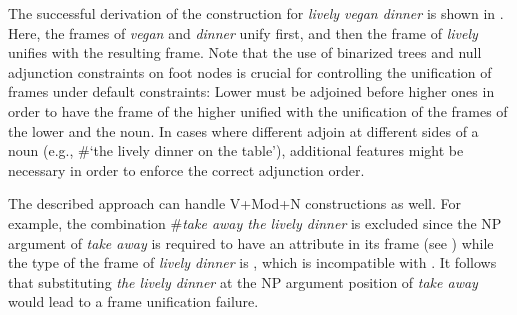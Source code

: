 \documentclass[output=paper,colorlinks,citecolor=brown,chinesefont]{langscibook}
\begin{document}
The successful derivation of the construction for \emph{lively vegan dinner} is shown in . Here, %
the frames of \emph{vegan} and \emph{dinner}  unify first, and then the frame of \emph{lively} unifies with the resulting frame. %
Note that the use of binarized trees and null adjunction constraints on foot nodes is crucial for controlling the unification of frames under default constraints:
Lower  must be adjoined before higher ones in order to have the frame of the higher  unified with the unification of the frames of the lower  and the noun.
In cases where different  adjoin at different sides of a noun (e.g., \#`the lively dinner on the table'), additional features might be necessary in order to enforce the correct adjunction order. 

The described approach can handle V+Mod+N  constructions as well.
For example, the combination \#\emph{take away the lively dinner} is excluded since 
the  NP argument of \emph{take away} is required to have an  attribute in its frame (see ) while the type of the frame of \emph{lively dinner} is \und{}, which is incompatible with .
It follows that substituting \emph{the lively dinner} at the  NP argument position of \emph{take away} would lead to a frame unification failure.
\end{document}
